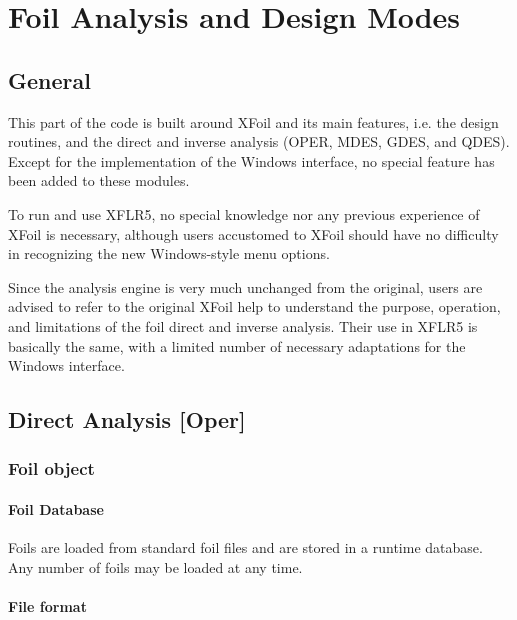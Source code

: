 \documentclass[a4paper,twoside,12pt,dvips]{article}
\begin{document}
\clearpage


\section{Foil Analysis and Design Modes}

\subsection{General}

This part of the code is built around XFoil and its main features,
i.e.  the design routines, and the direct and inverse analysis (OPER,
MDES, GDES, and QDES). Except for the implementation of the Windows
interface, no special feature has been added to these modules.

To run and use XFLR5, no special knowledge nor any previous experience
of XFoil is necessary, although users accustomed to XFoil should have
no difficulty in recognizing the new Windows-style menu options.

Since the analysis engine is very much unchanged from the original,
users are advised to refer to the original XFoil help to understand
the purpose, operation, and limitations of the foil direct and inverse
analysis. Their use in XFLR5 is basically the same, with a limited
number of necessary adaptations for the Windows interface.

\subsection{Direct Analysis [Oper]}

\subsubsection{Foil object}

\paragraph{Foil Database}

Foils are loaded from standard foil files and are stored in a runtime
database. Any number of foils may be loaded at any time.

\paragraph{File format}
\end{document}
